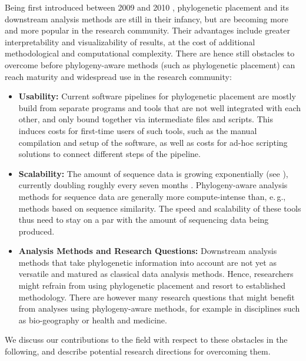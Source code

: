 Being first introduced between 2009 and 2010 \cite{Berger2009,Matsen2010a},
phylogenetic placement and its downstream analysis methods are still in their infancy,
but are becoming more and more popular in the research community.
Their advantages include greater interpretability and visualizability of results,
at the cost of additional methodological and computational complexity.
There are hence still obstacles to overcome before phylogeny-aware methods (such as phylogenetic placement)
can reach maturity and widespread use in the research community:

\begin{itemize}
    \item \textbf{Usability:}
          Current software pipelines for phylogenetic placement are mostly build from separate programs and tools
          that are not well integrated with each other, and only bound together via intermediate files and scripts.
          This induces costs for first-time users of such tools, such as the manual compilation and setup of the software,
          as well as costs for ad-hoc scripting solutions to connect different steps of the pipeline.
    \item \textbf{Scalability:}
          The amount of sequence data is growing exponentially (see ),
          currently doubling roughly every seven months \cite{Stephens2015}.
          Phylogeny-aware analysis methods for sequence data are generally more compute-intense than, e.\,g.,
          methods based on sequence similarity.
          The speed and scalability of these tools thus
          need to stay on a par with the amount of sequencing data being produced.
    \item \textbf{Analysis Methods and Research Questions:}
          Downstream analysis methods that take phylogenetic information into account
          are not yet as versatile and matured as classical data analysis methods.
          Hence, researchers might refrain from using phylogenetic placement and resort to established methodology.
          There are however many research questions that might benefit from analyses using phylogeny-aware methods,
          for example in disciplines such as bio-geography or health and medicine.
\end{itemize}

We discuss our contributions to the field with respect to these obstacles in the following,
and describe potential research directions for overcoming them.

